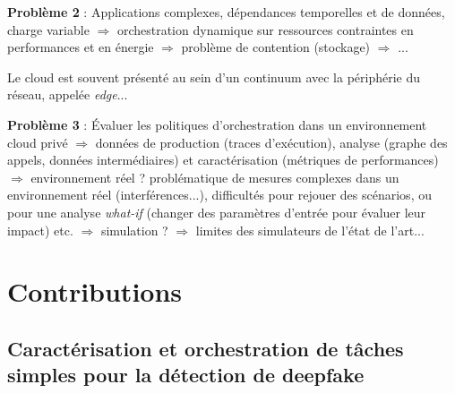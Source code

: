 
\textbf{Problème 2} : Applications complexes, dépendances temporelles et de données, charge variable $\Rightarrow$ orchestration dynamique sur ressources contraintes en performances et en énergie $\Rightarrow$ problème de contention (stockage) $\Rightarrow$ ...

Le cloud est souvent présenté au sein d'un continuum avec la périphérie du réseau, appelée \textit{edge}...


\textbf{Problème 3} : Évaluer les politiques d'orchestration dans un environnement cloud privé $\Rightarrow$ données de production (traces d'exécution), analyse (graphe des appels, données intermédiaires) et caractérisation (métriques de performances) $\Rightarrow$ environnement réel ? problématique de mesures complexes dans un environnement réel (interférences...), difficultés pour rejouer des scénarios, ou pour une analyse \textit{what-if} (changer des paramètres d'entrée pour évaluer leur impact) etc. $\Rightarrow$ simulation ? $\Rightarrow$ limites des simulateurs de l'état de l'art...


\section{Contributions}

\subsection{Caractérisation et orchestration de tâches simples pour la détection de deepfake}

